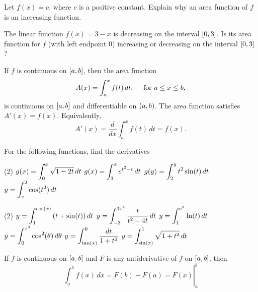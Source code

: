 \documentclass[../mathNotesPreamble]{subfiles}
\begin{document}
\begin{ex*}
  Let $f(x)=c$, where $c$ is a positive constant. Explain why an area function of $f$ is an increasing function.
\end{ex*}

\begin{ex*}
  The linear function $f(x)=3-x$ is decreasing on the interval ${\left[0,3\right]}$. Is its area function for $f$ (with left endpoint 0) increasing or decreasing on the interval ${\left[0,3\right]}$?
\end{ex*}
\pagebreak

\begin{thmBox*}
  \hspace*{10pt} 
  \parbox{0.9\linewidth}{
  If $f$ is continuous on ${\left[a,b\right]}$, then the area function
    \[A(x)=\int_a^x f(t)\,dt,\quad \textnormal{ for } a\leq x\leq b,\]
  is continuous on ${\left[a,b\right]}$ and differentiable on ${\left(a,b\right)}$. The area function satisfies $A'(x)=f(x)$. Equivalently,
    \[A'(x)=\frac{d}{dx}\int_a^x f(t)\,dt=f(x).\]
  }
\end{thmBox*}

\begin{ex*}
  For the following functions, find the derivatives
\end{ex*}
\begin{tasks}[after-item-skip=\stretch{1}](2)
  \task $g(x)=\displaystyle\int_0^x \sqrt{1-2t}\,dt$
  \task $g(x)=\displaystyle\int_3^x e^{t^2-t}\,dt$
  \task $g(y)=\displaystyle\int_2^y t^2\sin(t)\,dt$
  \task $y=\displaystyle\int_x^2 \cos(t^2)\,dt$
\end{tasks}
\pagebreak

\begin{tasks}[after-item-skip=\stretch{1}, resume](2)
  \task $y=\displaystyle\int_1^{\cos(x)} {\left(t+\sin(t)\right)}\,dt$
  \task $y=\displaystyle\int_{-3}^{3x^4} \frac{t}{t^2-4t}\,dt$
  \task $y=\displaystyle\int_1^{e^x} \ln(t)\,dt$
  \task $y=\displaystyle\int_0^{x^4} \cos^2(\theta)\,d\theta$
  \task $y=\displaystyle\int_{\tan(x)}^0 \frac{dt}{1+t^2}$
  \task $y=\displaystyle\int_{\sin(x)}^1 \sqrt{1+t^2}\,dt$
\end{tasks}
\pagebreak

\begin{thmBox*}
  If $f$ is continuous on ${\left[a,b\right]}$ and $F$ is any antiderivative of $f$ on ${\left[a,b\right]}$, then
    \[\left.\int_a^b f(x)\,dx=F(b)-F(a)=F(x)\right|_a^b\]
\end{thmBox*}
\end{document}
